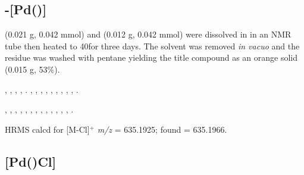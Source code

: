 
\subsection*{\trans{}-[Pd(\tBuxantphos)]}

\tBuXantphos{} (0.021 g, 0.042 mmol) and \ce{[Pd(cod)Cl2]} (0.012 g, 0.042 mmol) were dissolved in  in an NMR tube then heated to 40\degC for three days.  The solvent was removed \emph{in vacuo} and the residue was washed with pentane yielding the title compound as an orange solid (0.015 g, 53\%).


,
,
,
,
.
,
,
,
,
,
,
,
,
,
.

,
,
,
,
,
,
,
,
,
,
,
,
,
.

HRMS calcd for  [M-Cl]$^+$ \emph{m/z} = 635.1925; found = 635.1966.


\subsection*{[Pd(\tButhixantphosk)Cl]}

